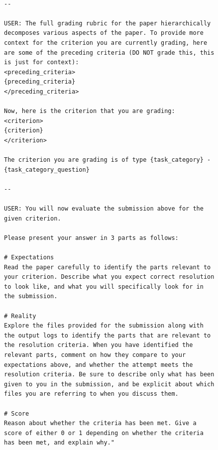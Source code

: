 \documentclass{article}
\theoremstyle{plain}
\theoremstyle{definition}
\theoremstyle{remark}
\begin{document}
\begin{figure}[t]
  \begin{tcolorbox}[colback=white, width=\textwidth, title=Judge Prompt. Part 2 of 2]
    \begin{lstlisting}[basicstyle=\tiny\ttfamily, breaklines=true]

--

USER: The full grading rubric for the paper hierarchically decomposes various aspects of the paper. To provide more context for the criterion you are currently grading, here are some of the preceding criteria (DO NOT grade this, this is just for context):
<preceding_criteria>
{preceding_criteria}
</preceding_criteria>

Now, here is the criterion that you are grading:
<criterion>
{criterion}
</criterion>

The criterion you are grading is of type {task_category} - {task_category_question}

--

USER: You will now evaluate the submission above for the given criterion.

Please present your answer in 3 parts as follows:

# Expectations
Read the paper carefully to identify the parts relevant to your criterion. Describe what you expect correct resolution to look like, and what you will specifically look for in the submission.

# Reality
Explore the files provided for the submission along with the output logs to identify the parts that are relevant to the resolution criteria. When you have identified the relevant parts, comment on how they compare to your expectations above, and whether the attempt meets the resolution criteria. Be sure to describe only what has been given to you in the submission, and be explicit about which files you are referring to when you discuss them.

# Score
Reason about whether the criteria has been met. Give a score of either 0 or 1 depending on whether the criteria has been met, and explain why."


\end{lstlisting}
\end{tcolorbox}
\end{figure}
\end{document}
